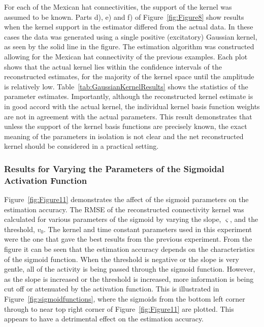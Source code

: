 \documentclass[12pt]{iopart}
\begin{document}
For each of the Mexican hat connectivities, the support of the kernel was assumed to be known. Parts d), e) and f) of Figure~\ref{fig:Figure8} show results when the kernel support in the estimator differed from the actual data. In these cases the data was generated using a single positive (excitatory) Gaussian kernel, as seen by the solid line in the figure. The estimation algorithm was constructed allowing for the Mexican hat connectivity of the previous examples. Each plot shows that the actual kernel lies within the confidence intervals of the reconstructed estimates, for the majority of the kernel space until the amplitude is relatively low. Table~\ref{tab:GaussianKernelResults} shows the statistics of the parameter estimates. Importantly, although the reconstructed kernel estimate is in good accord with the actual kernel, the individual kernel basis function weights are not in agreement with the actual parameters. This result demonstrates that unless the support of the kernel basis functions are precisely known, the exact meaning of the parameters in isolation is not clear and the net reconstructed kernel should be considered in a practical setting.

\subsubsection{Results for Varying the Parameters of the Sigmoidal Activation Function}

Figure~\ref{fig:Figure11} demonstrates the affect of the sigmoid parameters on the estimation accuracy. The RMSE of the reconstructed connectivity kernel was calculated for various parameters of the sigmoid by varying the slope, $\varsigma$, and the threshold, $v_0$. The kernel and time constant parameters used in this experiment were the one that gave the best results from the previous experiment. 
From the figure it can be seen that the estimation accuracy depends on the characteristics of the sigmoid function. When the threshold is negative or the slope is very gentle, all of the activity is being passed through the sigmoid function. However, as the slope is increased or the threshold is increased, more information is being cut off or attenuated by the activation function. This is illustrated in Figure~\ref{fig:sigmoidfunctions}, where the sigmoids from the bottom left corner through to near top right corner of Figure~\ref{fig:Figure11} are plotted. This appears to have a detrimental effect on the estimation accuracy.
\end{document}
